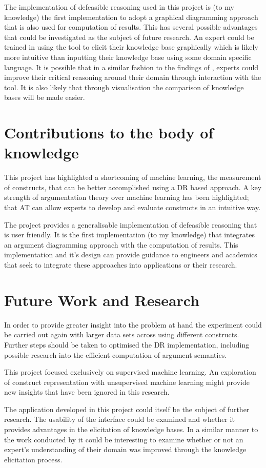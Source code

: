 The implementation of defeasible reasoning used in this project is (to my knowledge) the first implementation to adopt a graphical diagramming approach that is also used for computation of results. This has several possible advantages that could be investigated as the subject of future research. An expert could be trained in using the tool to elicit their knowledge base graphically which is likely more intuitive than inputting their knowledge base using some domain specific language. It is possible that in a similar fashion to the findings of \cite{twardy2004argument}, experts could improve their critical reasoning around their domain through interaction with the tool. It is also likely that through visualisation the comparison of knowledge bases will be made easier. 


\section{Contributions to the body of knowledge}

This project has highlighted a shortcoming of machine learning, the measurement of constructs, that can be better accomplished using a DR based approach. A key strength of argumentation theory over machine learning has been highlighted; that AT can allow experts to develop and evaluate constructs in an intuitive way.

The project provides a generalisable implementation of defeasible reasoning that is user friendly. It is the first implementation (to my knowledge) that integrates an argument diagramming approach with the computation of results. This implementation and it's design can provide guidance to engineers and academics that seek to integrate these approaches into applications or their research.

\section{Future Work and Research}

In order to provide greater insight into the problem at hand the experiment could be carried out again with larger data sets across using different constructs. Further steps should be taken to optimised the DR implementation, including possible research into the efficient computation of argument semantics.

This project focused exclusively on supervised machine learning. An exploration of construct representation with unsupervised machine learning might provide new insights that have been ignored in this research.

The application developed in this project could itself be the subject of further research. The usability of the interface could be examined and whether it provides advantages in the elicitation of knowledge bases. In a similar manner to the work conducted by \cite{twardy2004argument} it could be interesting to examine whether or not an expert's understanding of their domain was improved through the knowledge elicitation process.
